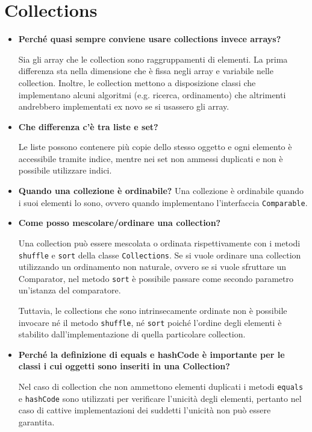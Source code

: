 \documentclass[12pt, a4paper]{article}
\begin{document}
\section{Collections}
\begin{itemize}
    \item \textbf{Perché quasi sempre conviene usare collections invece arrays?}
    
    Sia gli array che le collection sono raggruppamenti di elementi. La prima
    differenza sta nella dimensione che è fissa negli array e variabile nelle
    collection. Inoltre, le collection mettono a disposizione classi che implementano
    alcuni algoritmi (e.g. ricerca, ordinamento) che altrimenti andrebbero
    implementati ex novo se si usassero gli array.

    \item \textbf{Che differenza c'è tra liste e set?}
    
    Le liste possono contenere più copie dello stesso oggetto e ogni elemento è
    accessibile tramite indice, mentre nei set non ammessi duplicati e non è possibile
    utilizzare indici.

    \item \textbf{Quando una collezione è ordinabile?}
    Una collezione è ordinabile quando i suoi elementi lo sono, ovvero quando
    implementano l'interfaccia \texttt{Comparable}.

    \item \textbf{Come posso mescolare/ordinare una collection?}
    
    Una collection può essere mescolata o ordinata rispettivamente con i metodi
    \texttt{shuffle} e \texttt{sort} della classe \texttt{Collections}.
    Se si vuole ordinare una collection utilizzando un ordinamento non naturale,
    ovvero se si vuole sfruttare un Comparator, nel metodo \texttt{sort} è possibile
    passare come secondo parametro un'istanza del comparatore.

    Tuttavia, le collections che sono intrinsecamente ordinate non è possibile
    invocare né il metodo \texttt{shuffle}, né \texttt{sort} poiché l'ordine
    degli elementi è stabilito dall'implementazione di quella particolare collection.

    \item \textbf{Perché la	definizione	di equals e hashCode è importante per le classi
    i cui oggetti sono inseriti in	una	Collection?}

    Nel caso di collection che non ammettono elementi duplicati i metodi \texttt{equals}
    e \texttt{hashCode} sono utilizzati per verificare l'unicità degli elementi, pertanto
    nel caso di cattive implementazioni dei suddetti l'unicità non può essere garantita.
    

\end{itemize}
\end{document}
